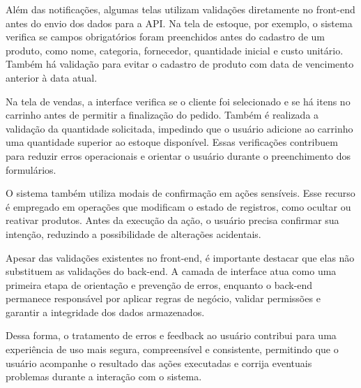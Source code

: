 Além das notificações, algumas telas utilizam validações diretamente no front-end antes do envio dos dados para a API. Na tela de estoque, por exemplo, o sistema verifica se campos obrigatórios foram preenchidos antes do cadastro de um produto, como nome, categoria, fornecedor, quantidade inicial e custo unitário. Também há validação para evitar o cadastro de produto com data de vencimento anterior à data atual.

Na tela de vendas, a interface verifica se o cliente foi selecionado e se há itens no carrinho antes de permitir a finalização do pedido. Também é realizada a validação da quantidade solicitada, impedindo que o usuário adicione ao carrinho uma quantidade superior ao estoque disponível. Essas verificações contribuem para reduzir erros operacionais e orientar o usuário durante o preenchimento dos formulários.

O sistema também utiliza modais de confirmação em ações sensíveis. Esse recurso é empregado em operações que modificam o estado de registros, como ocultar ou reativar produtos. Antes da execução da ação, o usuário precisa confirmar sua intenção, reduzindo a possibilidade de alterações acidentais.

Apesar das validações existentes no front-end, é importante destacar que elas não substituem as validações do back-end. A camada de interface atua como uma primeira etapa de orientação e prevenção de erros, enquanto o back-end permanece responsável por aplicar regras de negócio, validar permissões e garantir a integridade dos dados armazenados.

Dessa forma, o tratamento de erros e feedback ao usuário contribui para uma experiência de uso mais segura, compreensível e consistente, permitindo que o usuário acompanhe o resultado das ações executadas e corrija eventuais problemas durante a interação com o sistema.
